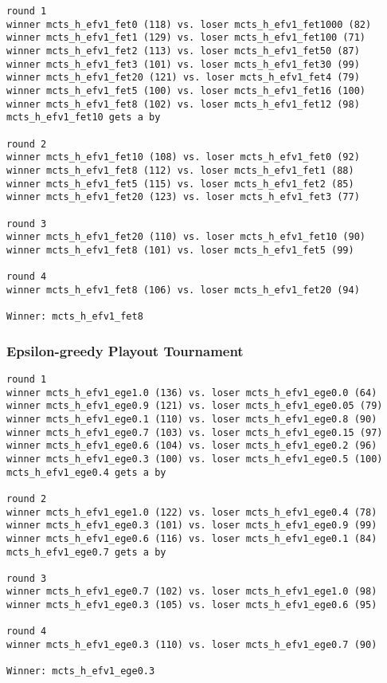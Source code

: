 \documentclass{article}
\begin{document}
\begin{verbatim}
round 1
winner mcts_h_efv1_fet0 (118) vs. loser mcts_h_efv1_fet1000 (82)
winner mcts_h_efv1_fet1 (129) vs. loser mcts_h_efv1_fet100 (71)
winner mcts_h_efv1_fet2 (113) vs. loser mcts_h_efv1_fet50 (87)
winner mcts_h_efv1_fet3 (101) vs. loser mcts_h_efv1_fet30 (99)
winner mcts_h_efv1_fet20 (121) vs. loser mcts_h_efv1_fet4 (79)
winner mcts_h_efv1_fet5 (100) vs. loser mcts_h_efv1_fet16 (100)
winner mcts_h_efv1_fet8 (102) vs. loser mcts_h_efv1_fet12 (98)
mcts_h_efv1_fet10 gets a by

round 2
winner mcts_h_efv1_fet10 (108) vs. loser mcts_h_efv1_fet0 (92)
winner mcts_h_efv1_fet8 (112) vs. loser mcts_h_efv1_fet1 (88)
winner mcts_h_efv1_fet5 (115) vs. loser mcts_h_efv1_fet2 (85)
winner mcts_h_efv1_fet20 (123) vs. loser mcts_h_efv1_fet3 (77)

round 3
winner mcts_h_efv1_fet20 (110) vs. loser mcts_h_efv1_fet10 (90)
winner mcts_h_efv1_fet8 (101) vs. loser mcts_h_efv1_fet5 (99)

round 4
winner mcts_h_efv1_fet8 (106) vs. loser mcts_h_efv1_fet20 (94)

Winner: mcts_h_efv1_fet8
\end{verbatim}

\subsubsection{Epsilon-greedy Playout Tournament}

\begin{verbatim}
round 1
winner mcts_h_efv1_ege1.0 (136) vs. loser mcts_h_efv1_ege0.0 (64)
winner mcts_h_efv1_ege0.9 (121) vs. loser mcts_h_efv1_ege0.05 (79)
winner mcts_h_efv1_ege0.1 (110) vs. loser mcts_h_efv1_ege0.8 (90)
winner mcts_h_efv1_ege0.7 (103) vs. loser mcts_h_efv1_ege0.15 (97)
winner mcts_h_efv1_ege0.6 (104) vs. loser mcts_h_efv1_ege0.2 (96)
winner mcts_h_efv1_ege0.3 (100) vs. loser mcts_h_efv1_ege0.5 (100)
mcts_h_efv1_ege0.4 gets a by

round 2
winner mcts_h_efv1_ege1.0 (122) vs. loser mcts_h_efv1_ege0.4 (78)
winner mcts_h_efv1_ege0.3 (101) vs. loser mcts_h_efv1_ege0.9 (99)
winner mcts_h_efv1_ege0.6 (116) vs. loser mcts_h_efv1_ege0.1 (84)
mcts_h_efv1_ege0.7 gets a by

round 3
winner mcts_h_efv1_ege0.7 (102) vs. loser mcts_h_efv1_ege1.0 (98)
winner mcts_h_efv1_ege0.3 (105) vs. loser mcts_h_efv1_ege0.6 (95)

round 4
winner mcts_h_efv1_ege0.3 (110) vs. loser mcts_h_efv1_ege0.7 (90)

Winner: mcts_h_efv1_ege0.3
\end{verbatim}
\end{document}
